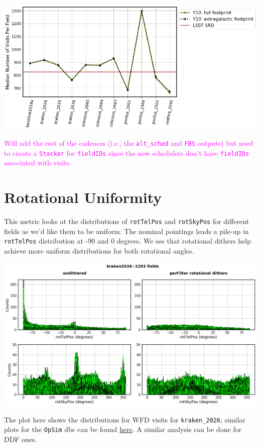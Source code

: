 \documentclass[a4paper,10pt]{article}
\newcommand{\ttt}[1]{\texttt{#1}}
\newcommand{\cl}[1]{\textcolor{magenta}{#1}}
\begin{document}
\begin{minipage}{\columnwidth}
\vspace*{2em}
\centering
\includegraphics[width=.9\columnwidth]{lss_compare_median_nvisits_11dbs.png}
\vspace*{2em}
\end{minipage}

\cl{Will add the rest of the cadences (i.e., the \ttt{alt\_sched} and \ttt{FBS} outputs) but need to create a \ttt{Stacker} for \ttt{fieldIDs} since the new schedulers don't have \ttt{fieldIDs} associated with visits.}


\newpage
\section*{Rotational Uniformity\label{rotational dithers}}
This metric looks at the distributions of \ttt{rotTelPos} and \ttt{rotSkyPos} for different fields as we'd like them to be uniform. The nominal pointings leads a pile-up in \ttt{rotTelPos} distribution at -90 and 0 degrees. We see that rotational dithers help achieve more uniform distributions for both rotational angles.

\begin{minipage}{\columnwidth}
\vspace*{2em}
\centering
\includegraphics[width=\columnwidth]{lss_compare_rot_angles_kraken_2026_perfield_nodith_wdith.png}
\vspace*{2em}
\end{minipage}
The plot here shows the distributions for WFD visits for \ttt{kraken\_2026}; similar plots for the \ttt{OpSim} dbs can be found \href{https://github.com/LSSTDESC/ObsStrat/blob/issue/3/desc-dithers/code/descDithers/compare_rot_distributions_perfield.ipynb}{here}. A similar analysis can be done for DDF ones.
\end{document}
